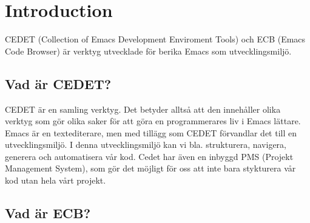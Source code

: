 \documentclass[12pt]{article} %
\begin{document}

\tableofcontents %

\newpage %


\section{Introduction} %

CEDET (Collection of Emacs Development Enviroment Tools) och ECB (Emacs Code Browser) är verktyg utvecklade för berika Emacs som utvecklingsmiljö. %


\subsection{Vad är CEDET?} %

CEDET är en samling verktyg. Det betyder alltså att den innehåller olika verktyg som gör olika saker för att göra en programmerares liv i Emacs lättare. 
Emacs är en textediterare, men med tillägg som CEDET förvandlar det till en utvecklingsmiljö.  I denna utvecklingsmiljö kan vi bla. strukturera, navigera, generera och automatisera vår kod. Cedet har även en inbyggd PMS (Projekt Management System), som gör det möjligt för oss att inte bara stykturera vår kod utan hela vårt projekt.


\subsection{Vad är ECB?} %



\end{document}
